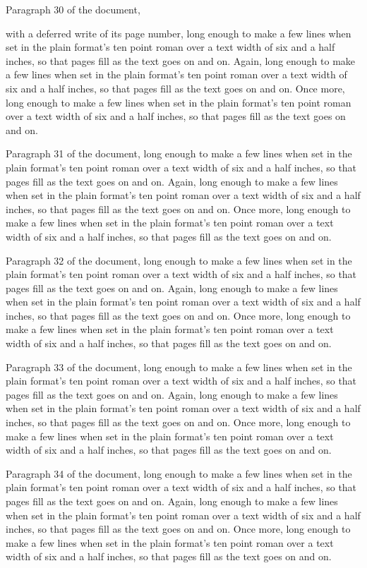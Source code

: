 Paragraph 30 of the document, with a deferred write of its page number, long enough to make a few lines when set in the plain format's ten point roman over a text width of six and a half inches, so that pages fill as the text goes on and on. Again, long enough to make a few lines when set in the plain format's ten point roman over a text width of six and a half inches, so that pages fill as the text goes on and on. Once more, long enough to make a few lines when set in the plain format's ten point roman over a text width of six and a half inches, so that pages fill as the text goes on and on.

Paragraph 31 of the document, long enough to make a few lines when set in the plain format's ten point roman over a text width of six and a half inches, so that pages fill as the text goes on and on. Again, long enough to make a few lines when set in the plain format's ten point roman over a text width of six and a half inches, so that pages fill as the text goes on and on. Once more, long enough to make a few lines when set in the plain format's ten point roman over a text width of six and a half inches, so that pages fill as the text goes on and on.

Paragraph 32 of the document, long enough to make a few lines when set in the plain format's ten point roman over a text width of six and a half inches, so that pages fill as the text goes on and on. Again, long enough to make a few lines when set in the plain format's ten point roman over a text width of six and a half inches, so that pages fill as the text goes on and on. Once more, long enough to make a few lines when set in the plain format's ten point roman over a text width of six and a half inches, so that pages fill as the text goes on and on.

Paragraph 33 of the document, long enough to make a few lines when set in the plain format's ten point roman over a text width of six and a half inches, so that pages fill as the text goes on and on. Again, long enough to make a few lines when set in the plain format's ten point roman over a text width of six and a half inches, so that pages fill as the text goes on and on. Once more, long enough to make a few lines when set in the plain format's ten point roman over a text width of six and a half inches, so that pages fill as the text goes on and on.

Paragraph 34 of the document, long enough to make a few lines when set in the plain format's ten point roman over a text width of six and a half inches, so that pages fill as the text goes on and on. Again, long enough to make a few lines when set in the plain format's ten point roman over a text width of six and a half inches, so that pages fill as the text goes on and on. Once more, long enough to make a few lines when set in the plain format's ten point roman over a text width of six and a half inches, so that pages fill as the text goes on and on.

